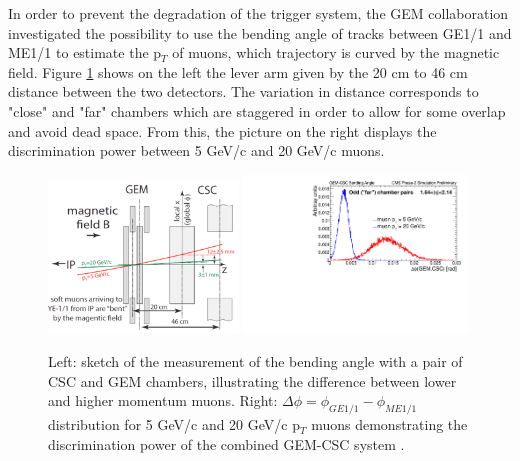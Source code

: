     In order to prevent the degradation of the trigger system, the GEM collaboration investigated the possibility to use the bending angle of tracks between GE1/1 and ME1/1 to estimate the p$_T$ of muons, which trajectory is curved by the magnetic field. Figure \ref{fig:II-1-csc-bending} shows on the left the lever arm given by the 20 cm to 46 cm distance between the two detectors. The variation in distance corresponds to "close" and "far" chambers which are staggered in order to allow for some overlap and avoid dead space. From this, the picture on the right displays the discrimination power between 5 GeV/c and 20 GeV/c muons. \\

    \begin{figure}[t!]
      \centering
      \includegraphics[width=0.45\textwidth]{img/II-1-gem/gem-csc-bending-1.png}
      \includegraphics[width=0.53\textwidth]{img/II-1-gem/gem-csc-bending-2.pdf}
      \caption{Left: sketch of the measurement of the bending angle with a pair of CSC and GEM chambers, illustrating the difference between lower and higher momentum muons. Right: $ \Delta \phi = \phi_{GE1/1} - \phi_{ME1/1} $ distribution for 5 GeV/c and 20 GeV/c p$_T$ muons demonstrating the discrimination power of the combined GEM-CSC system \cite{Colaleo:2021453}.}
      \label{fig:II-1-csc-bending}
    \end{figure}

